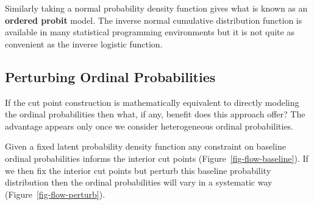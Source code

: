 \documentclass[
  letterpaper,
  DIV=11,
  numbers=noendperiod]{scrartcl}
\begin{document}
Similarly taking a normal probability density function gives what is
known as an \textbf{ordered probit} model. The inverse normal cumulative
distribution function is available in many statistical programming
environments but it is not quite as convenient as the inverse logistic
function.

\subsection{Perturbing Ordinal
Probabilities}\label{perturbing-ordinal-probabilities}

If the cut point construction is mathematically equivalent to directly
modeling the ordinal probabilities then what, if any, benefit does this
approach offer? The advantage appears only once we consider
heterogeneous ordinal probabilities.

Given a fixed latent probability density function any constraint on
baseline ordinal probabilities informs the interior cut points
(Figure~\ref{fig-flow-baseline}). If we then fix the interior cut points
but perturb this baseline probability distribution then the ordinal
probabilities will vary in a systematic way
(Figure~\ref{fig-flow-perturb}).
\end{document}
